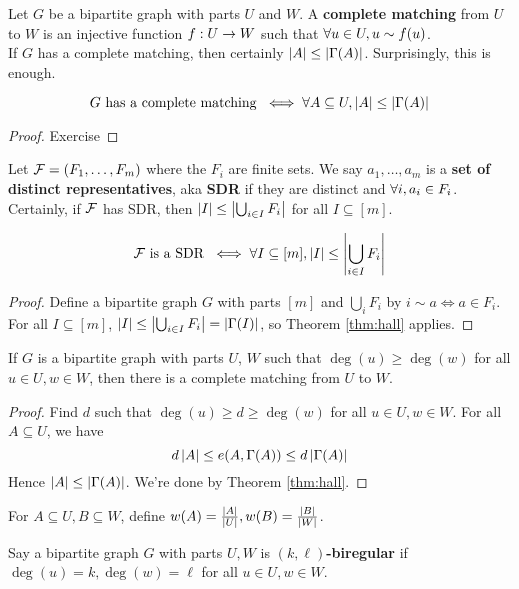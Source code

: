 \documentclass{article}
\begin{document}
Let $G$ be a bipartite graph with parts $U$ and $W$. A {\bf complete matching} from $U$ to $W$ is an injective function $f : U \rightarrow W$ such that $\forall u \in U, u \sim f(u)$. \\
If $G$ has a complete matching, then certainly $\left\lvert A\right\rvert \le \left\lvert \Gamma(A)\right\rvert$. Surprisingly, this is enough.

\begin{nthm}\label{thm:hall}
  $$G \text{ has a complete matching } \iff \forall A \subseteq U, \left\lvert A\right\rvert \le \left\lvert \Gamma(A)\right\rvert$$
\end{nthm}
\begin{proof}
  Exercise
\end{proof}

Let $\mathcal F = (F_1, \dots, F_m)$ where the $F_i$ are finite sets. We say $a_1, \dots, a_m$ is a {\bf set of distinct representatives}, aka {\bf SDR} if they are distinct and $\forall i, a_i \in F_i$. Certainly, if $\mathcal F$ has SDR, then $\left\lvert I\right\rvert \le \left\lvert \bigcup_{i \in I} F_i\right\rvert$ for all $I \subseteq [m]$.

\begin{nthm}
  $$\mathcal F \text{ is a SDR } \iff \forall I \subseteq [m], \left\lvert I\right\rvert \le \left\lvert \bigcup_{i \in I} F_i\right\rvert$$
\end{nthm}
\begin{proof}
  Define a bipartite graph $G$ with parts $[m]$ and $\bigcup_i F_i$ by $i \sim a \iff a \in F_i$. For all $I \subseteq [m]$, $\left\lvert I\right\rvert \le \left\lvert \bigcup_{i \in I} F_i\right\rvert = \left\lvert \Gamma(I)\right\rvert$, so Theorem \ref{thm:hall} applies.
\end{proof}

\begin{nthm}
  If $G$ is a bipartite graph with parts $U$, $W$ such that $\deg(u) \ge \deg(w)$ for all $u \in U, w \in W$, then there is a complete matching from $U$ to $W$.
\end{nthm}
\begin{proof}
  Find $d$ such that $\deg(u) \ge d \ge \deg(w)$ for all $u \in U, w \in W$. For all $A \subseteq U$, we have
  $$d\left\lvert A\right\rvert \le e(A, \Gamma(A)) \le d\left\lvert \Gamma(A)\right\rvert$$
  Hence $\left\lvert A\right\rvert \le \left\lvert \Gamma(A)\right\rvert$. We're done by Theorem \ref{thm:hall}.
\end{proof}

For $A \subseteq U, B \subseteq W$, define $w(A) = \frac{\left\lvert A\right\rvert}{\left\lvert U\right\rvert}, w(B) = \frac{\left\lvert B\right\rvert}{\left\lvert W\right\rvert}$.

Say a bipartite graph $G$ with parts $U, W$ is {\bf $(k, \ell)$-biregular} if
$\deg(u) = k, \deg(w) = \ell$ for all $u \in U, w \in W$.
\end{document}
